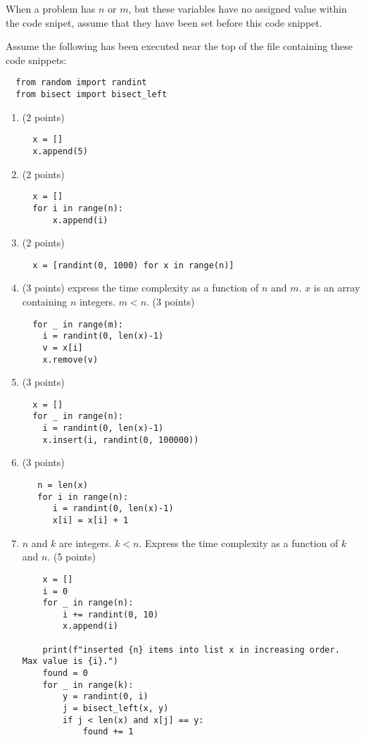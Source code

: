 \documentclass{article}
\begin{document}
When a problem has $n$ or $m$, but these variables have no assigned value
within the code snipet, assume that they have been set before this code
snippet.

Assume the following has been executed near the top of the file containing
these code snippets:

\begin{verbatim}
  from random import randint
  from bisect import bisect_left
\end{verbatim}

\begin{enumerate}[label=(\alph*)]

\item (2 points)
  
\begin{verbatim}
  x = []
  x.append(5)
\end{verbatim}

\item (2 points)

\begin{verbatim}
  x = []
  for i in range(n):
      x.append(i)
\end{verbatim}

\item (2 points)

\begin{verbatim}
  x = [randint(0, 1000) for x in range(n)]
\end{verbatim}

\item (3 points) express the time complexity as a function of $n$ and $m$.
  $x$ is an array containing $n$ integers. $m < n$. (3 points)

\begin{verbatim}
  for _ in range(m):
    i = randint(0, len(x)-1)
    v = x[i]
    x.remove(v)
\end{verbatim}

\item (3 points)
\begin{verbatim}
  x = []
  for _ in range(n):
    i = randint(0, len(x)-1)
    x.insert(i, randint(0, 100000))
\end{verbatim}

\item (3 points)
\begin{verbatim}
   n = len(x)
   for i in range(n):
      i = randint(0, len(x)-1)
      x[i] = x[i] + 1
\end{verbatim}

\item $n$ and $k$ are integers.  $k < n$.  Express the time complexity as
  a function of $k$ and $n$. (5 points)
  
\begin{verbatim}
    x = []
    i = 0
    for _ in range(n):
        i += randint(0, 10)
        x.append(i)

    print(f"inserted {n} items into list x in increasing order.  Max value is {i}.")
    found = 0
    for _ in range(k):
        y = randint(0, i)
        j = bisect_left(x, y)
        if j < len(x) and x[j] == y:
            found += 1
\end{verbatim}
\end{enumerate}
\end{document}
